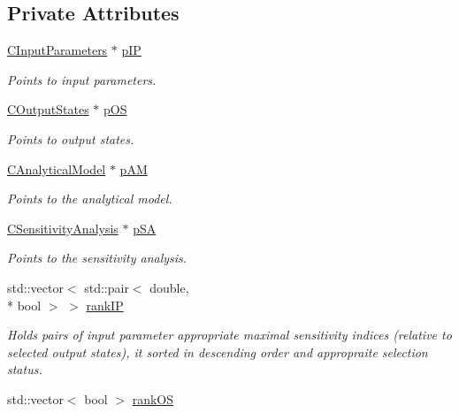 \subsection*{Private Attributes}
\begin{DoxyCompactItemize}
\item 
\hyperlink{class_go_s_u_m_1_1_c_input_parameters}{C\-Input\-Parameters} $\ast$ \hyperlink{class_go_s_u_m_1_1_c_reduction_a14167cf018ab466dbaa108c7fcf2c0f0}{p\-I\-P}
\begin{DoxyCompactList}\small\item\em Points to input parameters. \end{DoxyCompactList}\item 
\hyperlink{class_go_s_u_m_1_1_c_output_states}{C\-Output\-States} $\ast$ \hyperlink{class_go_s_u_m_1_1_c_reduction_a4cd38c6a79d17411f3345147ac6aa1da}{p\-O\-S}
\begin{DoxyCompactList}\small\item\em Points to output states. \end{DoxyCompactList}\item 
\hyperlink{class_go_s_u_m_1_1_c_analytical_model}{C\-Analytical\-Model} $\ast$ \hyperlink{class_go_s_u_m_1_1_c_reduction_a5efc18783ec4b8ca049009edbc1f5895}{p\-A\-M}
\begin{DoxyCompactList}\small\item\em Points to the analytical model. \end{DoxyCompactList}\item 
\hyperlink{class_go_s_u_m_1_1_c_sensitivity_analysis}{C\-Sensitivity\-Analysis} $\ast$ \hyperlink{class_go_s_u_m_1_1_c_reduction_a073798ed0b4c0323a2626e93556917e8}{p\-S\-A}
\begin{DoxyCompactList}\small\item\em Points to the sensitivity analysis. \end{DoxyCompactList}\item 
std\-::vector$<$ std\-::pair$<$ double, \\*
bool $>$ $>$ \hyperlink{class_go_s_u_m_1_1_c_reduction_a819c0514f93b8384b5aea14d75669ddf}{rank\-I\-P}
\begin{DoxyCompactList}\small\item\em Holds pairs of input parameter appropriate maximal sensitivity indices (relative to selected output states), it sorted in descending order and appropraite selection status. \end{DoxyCompactList}\item 
std\-::vector$<$ bool $>$ \hyperlink{class_go_s_u_m_1_1_c_reduction_a2e15526f1046a79bf00404521806d36d}{rank\-O\-S}

\end{DoxyCompactItemize}
